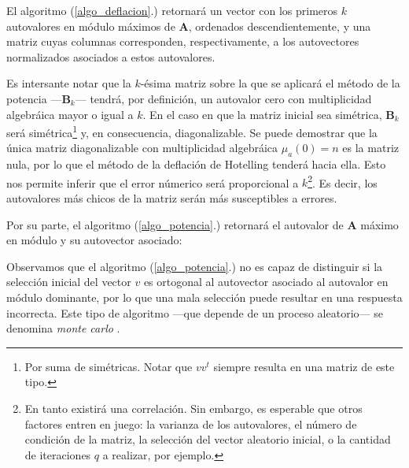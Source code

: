 \vspace{1em}


El algoritmo (\ref{algo_deflacion}.) retornará un vector con los primeros $k$ autovalores en módulo máximos de \textbf{A}, ordenados descendientemente, y una matriz cuyas columnas corresponden, respectivamente, a los autovectores normalizados asociados a estos autovalores. 

\vspace{1em}
Es intersante notar que la $k$-ésima matriz sobre la que se aplicará el método de la potencia ---\textbf{B}$_k$--- tendrá, por definición, un autovalor cero con multiplicidad algebráica mayor o igual a $k$. En el caso en que la matriz inicial sea simétrica, \textbf{B}$_k$ será simétrica\footnote{Por suma de simétricas. Notar que $v v^t$ siempre resulta en una matriz de este tipo.} y, en consecuencia, diagonalizable. Se puede demostrar que la única matriz diagonalizable con multiplicidad algebráica $\mu_{a}(0) = n$ es la matriz nula, por lo que el método de la deflación de Hotelling tenderá hacia ella. Esto nos permite inferir que el error númerico será proporcional a $k$\footnote{En tanto existirá una correlación. Sin embargo, es esperable que otros factores entren en juego: la varianza de los autovalores, el número de condición de la matriz, la selección del vector aleatorio inicial, o la cantidad de iteraciones $q$ a realizar, por ejemplo.}. Es decir, los autovalores más chicos de la matriz serán más susceptibles a errores.  


\vspace{2em}
\noindent Por su parte, el algoritmo (\ref{algo_potencia}.) retornará el autovalor de \textbf{A} máximo en módulo y su autovector asociado:

\vspace{1em}


\vspace{1em}
Observamos que el algoritmo (\ref{algo_potencia}.) no es capaz de distinguir si la selección inicial del vector $v$ es ortogonal al autovector asociado al autovalor en módulo dominante, por lo que una mala selección puede resultar en una respuesta incorrecta. Este tipo de algoritmo ---que depende de un proceso aleatorio--- se denomina \textit{monte carlo} \cite{Brassard}. 

